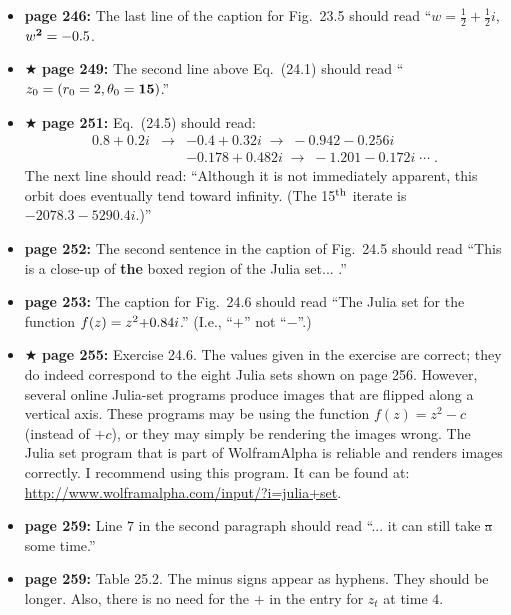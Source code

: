\documentclass[12pt]{article}
\begin{document}
\begin{itemize}
  \item {\bf page 246:}  The last line of the caption for Fig.~23.5
    should read ``$w = \frac{1}{2} + \frac{1}{2}i$, $w^{\bf 2} =
    -0.5$. 

  \item $\bigstar$ {\bf page 249:} The second line above Eq.~(24.1)
    should read ``$z_0 = (r_0 = 2, \theta_0 =  {\bf 15})$.''

  \item $\bigstar$ {\bf page 251:} Eq.~(24.5) should read:
\begin{eqnarray}
  0.8 + 0.2i & \longrightarrow & -0.4 + 0.32i \; \longrightarrow \;
  -0.942 - 0.256i\\
& & -0.178 + 0.482i \; \longrightarrow \; -1.201 - 0.172i \;
 \cdots \;.
\end{eqnarray}
The next line should read: ``Although it is not immediately apparent,
this orbit does eventually tend toward infinity.  (The 15$^{\rm th}$
iterate is $-2078.3 - 5290.4i$.)''

  \item {\bf page 252:}  The second sentence in the caption of
    Fig.~24.5 should read ``This is a close-up of {\bf the} boxed
    region of the Julia set... .''

\item {\bf page 253:}  The caption for Fig.~24.6 should read ``The
  Julia set for the function $f(z) = z^2 {\bf +} 0.84i$.'' (I.e., ``$+$''
  not ``$-$''.)

\item $\bigstar$ {\bf page 255:}  Exercise 24.6.  The values given in
  the exercise are correct; they do indeed correspond to the eight
  Julia sets shown on page 256.  However, several online Julia-set
  programs produce images that are flipped along a vertical axis.  These
  programs may be using the function $f(z) = z^2 - c$ (instead of
  $+c$), or they may simply be rendering the images wrong.  The Julia
  set program that is part of WolframAlpha is reliable and renders
  images correctly.  I recommend using this program.  It can be found
  at: \url{http://www.wolframalpha.com/input/?i=julia+set}. 

\item {\bf page 259:}  Line $7$ in the second paragraph should read
  ``... it can still take \sout{a} some time.'' %

\item {\bf page 259:}  Table 25.2.  The minus signs appear as hyphens.
  They should be longer.  Also, there is no need for the $+$ in the
  entry for $z_t$ at time $4$.


\end{itemize}
\end{document}
